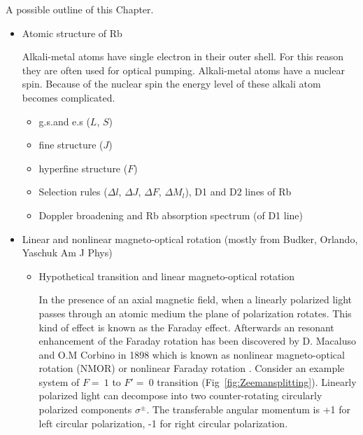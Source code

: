 A possible outline of this Chapter.
\begin{itemize}
\item Atomic structure of Rb

Alkali-metal atoms have single electron in their outer shell. For this reason they are often used for optical pumping. Alkali-metal atoms have a nuclear spin.
 Because of the nuclear spin the energy level of these alkali atom becomes complicated.
  \begin{itemize}
  \item g.s.and e.s ($L$, $S$)
  
  
  \item fine structure ($J$)
  
  \item hyperfine structure ($F$)
  
  
  \item Selection rules ($\Delta l$, $\Delta J$, $\Delta F$, $\Delta
    M_l$), D1 and D2 lines of Rb
    
  
  \item Doppler broadening and Rb absorption spectrum (of D1 line)
  \end{itemize}
\item Linear and nonlinear magneto-optical rotation (mostly from
  Budker, Orlando, Yaschuk Am J Phys)
  \begin{itemize}
  \item Hypothetical transition and linear magneto-optical rotation
  
 In the presence of an axial magnetic field, when a linearly polarized light passes through an atomic medium the plane of polarization rotates. This kind of effect is known as the Faraday effect. Afterwards an resonant enhancement of the Faraday rotation has been discovered by D. Macaluso and O.M Corbino in 1898 which is known as nonlinear magneto-optical rotation (NMOR) or nonlinear Faraday rotation \cite{budker2013optical}. Consider an example system of $ F=~1$ to $F'=~0$ transition (Fig~\ref{fig:Zeemansplitting}).  Linearly polarized light can decompose into two counter-rotating circularly polarized components $\sigma^\pm$. The transferable angular momentum is +1 for left circular polarization, -1 for right circular polarization. 
 

\end{itemize}
\end{itemize}
